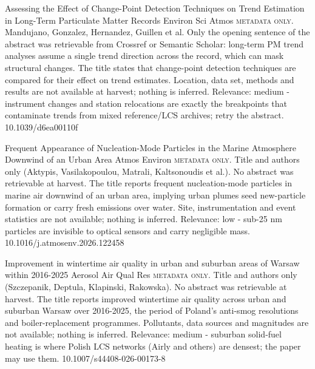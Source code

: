 \documentclass[10pt]{article}
\begin{document}
{Assessing the Effect of Change-Point Detection Techniques on Trend Estimation in Long-Term Particulate Matter Records}
{Environ Sci Atmos}
{\textsc{metadata only.} Mandujano, Gonzalez, Hernandez, Guillen et al. Only the opening sentence of the abstract was retrievable from Crossref or Semantic Scholar: long-term PM trend analyses assume a single trend direction across the record, which can mask structural changes. The title states that change-point detection techniques are compared for their effect on trend estimates. Location, data set, methods and results are not available at harvest; nothing is inferred. Relevance: medium - instrument changes and station relocations are exactly the breakpoints that contaminate trends from mixed reference/LCS archives; retry the abstract.}
{10.1039/d6ea00110f}

{Frequent Appearance of Nucleation-Mode Particles in the Marine Atmosphere Downwind of an Urban Area}
{Atmos Environ}
{\textsc{metadata only.} Title and authors only (Aktypis, Vasilakopoulou, Matrali, Kaltsonoudis et al.). No abstract was retrievable at harvest. The title reports frequent nucleation-mode particles in marine air downwind of an urban area, implying urban plumes seed new-particle formation or carry fresh emissions over water. Site, instrumentation and event statistics are not available; nothing is inferred. Relevance: low - sub-25 nm particles are invisible to optical sensors and carry negligible mass.}
{10.1016/j.atmosenv.2026.122458}

{Improvement in wintertime air quality in urban and suburban areas of Warsaw within 2016-2025}
{Aerosol Air Qual Res}
{\textsc{metadata only.} Title and authors only (Szczepanik, Deptula, Klapinski, Rakowska). No abstract was retrievable at harvest. The title reports improved wintertime air quality across urban and suburban Warsaw over 2016-2025, the period of Poland's anti-smog resolutions and boiler-replacement programmes. Pollutants, data sources and magnitudes are not available; nothing is inferred. Relevance: medium - suburban solid-fuel heating is where Polish LCS networks (Airly and others) are densest; the paper may use them.}
{10.1007/s44408-026-00173-8}

\par{}\baselineskip{}\baselineskip
{}
\end{document}
